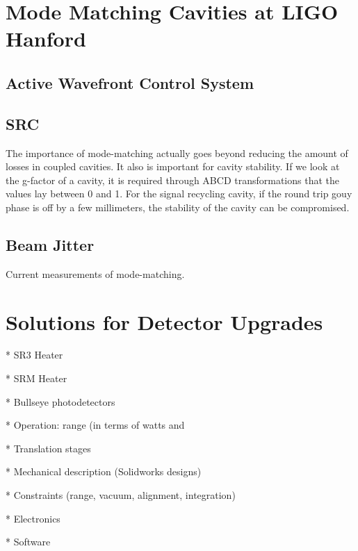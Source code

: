\documentclass[oneside]{book}
\begin{document}
		
		

\chapter{Mode Matching Cavities at LIGO Hanford}

	\section{Active Wavefront Control System}
	
	\section{SRC}
	The importance of mode-matching actually goes beyond reducing the amount of losses in coupled cavities.  It also is important for cavity stability.  If we look at the g-factor of a cavity, it is required through ABCD transformations that the values lay between 0 and 1.  For the signal recycling cavity, if the round trip gouy phase is off by a few millimeters, the stability of the cavity can be compromised. 
	
	
	\section{Beam Jitter}
	
	Current measurements of mode-matching.


\chapter{Solutions for Detector Upgrades}

* SR3 Heater

* SRM Heater

* Bullseye photodetectors

* Operation: range (in terms of watts and %

* Translation stages

* Mechanical description (Solidworks designs)

* Constraints (range, vacuum, alignment, integration)

* Electronics 

* Software


	\listoffigures
	\listoftables
\end{document}
